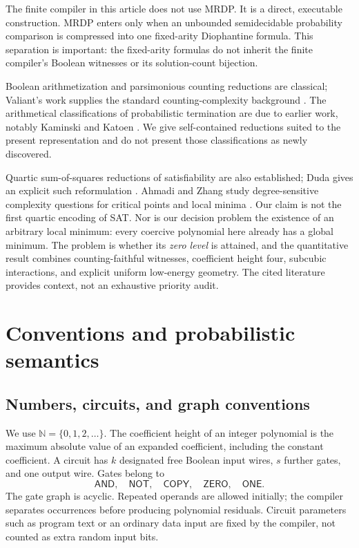 \documentclass[11pt,letterpaper]{article}
\numberwithin{equation}{section}
\theoremstyle{definition}
\theoremstyle{remark}
\newcommand{\N}{\mathbb N}
\newcommand{\srcmark}[1]{\par\noindent{\small\itshape [source~#1]}\par}
\begin{document}
The finite compiler in this article does not use MRDP. It is a direct,
executable construction. MRDP enters only when an unbounded semidecidable
probability comparison is compressed into one fixed-arity Diophantine
formula. This separation is important: the fixed-arity formulas do not
inherit the finite compiler's Boolean witnesses or its solution-count
bijection.

Boolean arithmetization and parsimonious counting reductions are classical;
Valiant's work supplies the standard counting-complexity background
\cite{b62s13-valiant}. The arithmetical classifications of probabilistic termination
are due to earlier work, notably Kaminski and Katoen \cite{kaminski-katoen}. We give
self-contained reductions suited to the present representation and do not
present those classifications as newly discovered.


Quartic sum-of-squares reductions of satisfiability are also established;
Duda gives an explicit such reformulation \cite{b62s13-duda}. Ahmadi and Zhang
study degree-sensitive complexity questions for critical points and local
minima \cite{b62s13-ahmadi}. Our claim is not the first quartic encoding of SAT.
Nor is our decision problem the existence of an arbitrary local minimum:
every coercive polynomial here already has a global minimum. The problem
is whether its \emph{zero level} is attained, and the quantitative result
combines counting-faithful witnesses, coefficient height four, subcubic
interactions, and explicit uniform low-energy geometry. The cited
literature provides context, not an exhaustive priority audit.

\section{Conventions and probabilistic semantics}
\srcmark{13}

\subsection{Numbers, circuits, and graph conventions}
We use $\N=\{0,1,2,\ldots\}$. The coefficient height of an integer polynomial
is the maximum absolute value of an expanded coefficient, including the
constant coefficient. A circuit has $k$ designated free Boolean input wires,
$s$ further gates, and one output wire. Gates belong to
\[
\mathsf{AND},\quad\mathsf{NOT},\quad\mathsf{COPY},\quad
\mathsf{ZERO},\quad\mathsf{ONE}.
\]
The gate graph is acyclic. Repeated operands are allowed initially; the
compiler separates occurrences before producing polynomial residuals.
Circuit parameters such as program text or an ordinary data input are fixed
by the compiler, not counted as extra random input bits.
\end{document}
